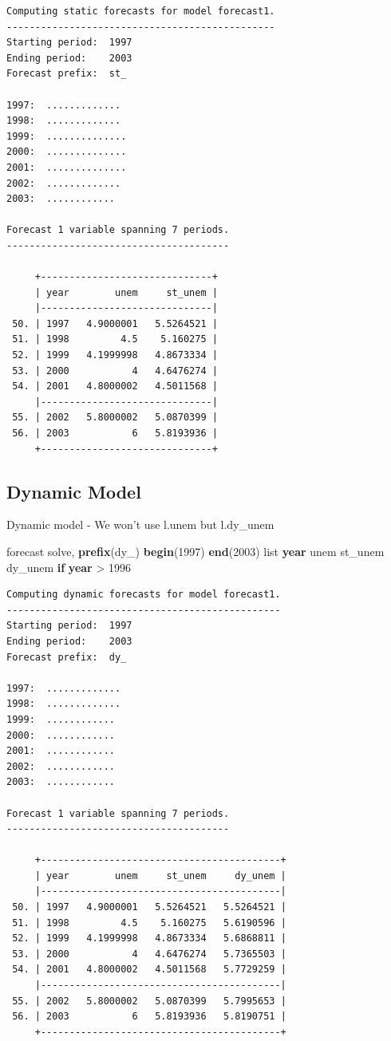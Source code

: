 \documentclass[
]{book}
\newenvironment{Shaded}{\begin{snugshade}}{\end{snugshade}}
\newcommand{\FunctionTok}[1]{\textcolor[rgb]{0.13,0.29,0.53}{\textbf{#1}}}
\newcommand{\KeywordTok}[1]{\textcolor[rgb]{0.13,0.29,0.53}{\textbf{#1}}}
\newcommand{\NormalTok}[1]{#1}
\newcommand{\OtherTok}[1]{\textcolor[rgb]{0.56,0.35,0.01}{#1}}
\begin{document}
\begin{verbatim}
Computing static forecasts for model forecast1.
-----------------------------------------------
Starting period:  1997
Ending period:    2003
Forecast prefix:  st_

1997:  .............
1998:  .............
1999:  ..............
2000:  ..............
2001:  ..............
2002:  .............
2003:  ............

Forecast 1 variable spanning 7 periods.
---------------------------------------

     +------------------------------+
     | year        unem     st_unem |
     |------------------------------|
 50. | 1997   4.9000001   5.5264521 |
 51. | 1998         4.5    5.160275 |
 52. | 1999   4.1999998   4.8673334 |
 53. | 2000           4   4.6476274 |
 54. | 2001   4.8000002   4.5011568 |
     |------------------------------|
 55. | 2002   5.8000002   5.0870399 |
 56. | 2003           6   5.8193936 |
     +------------------------------+
\end{verbatim}

\subsection*{Dynamic Model}\label{dynamic-model}

Dynamic model - We won't use l.unem but l.dy\_unem

\begin{Shaded}
\begin{Highlighting}[]
\NormalTok{forecast solve, }\KeywordTok{prefix}\NormalTok{(dy\_) }\KeywordTok{begin}\NormalTok{(1997) }\KeywordTok{end}\NormalTok{(2003)}
\OtherTok{list} \FunctionTok{year}\NormalTok{ unem st\_unem dy\_unem }\KeywordTok{if} \FunctionTok{year}\NormalTok{ \textgreater{} 1996}
\end{Highlighting}
\end{Shaded}

\begin{verbatim}
Computing dynamic forecasts for model forecast1.
------------------------------------------------
Starting period:  1997
Ending period:    2003
Forecast prefix:  dy_

1997:  .............
1998:  .............
1999:  ............
2000:  ............
2001:  ............
2002:  ............
2003:  ............

Forecast 1 variable spanning 7 periods.
---------------------------------------

     +------------------------------------------+
     | year        unem     st_unem     dy_unem |
     |------------------------------------------|
 50. | 1997   4.9000001   5.5264521   5.5264521 |
 51. | 1998         4.5    5.160275   5.6190596 |
 52. | 1999   4.1999998   4.8673334   5.6868811 |
 53. | 2000           4   4.6476274   5.7365503 |
 54. | 2001   4.8000002   4.5011568   5.7729259 |
     |------------------------------------------|
 55. | 2002   5.8000002   5.0870399   5.7995653 |
 56. | 2003           6   5.8193936   5.8190751 |
     +------------------------------------------+
\end{verbatim}
\end{document}
